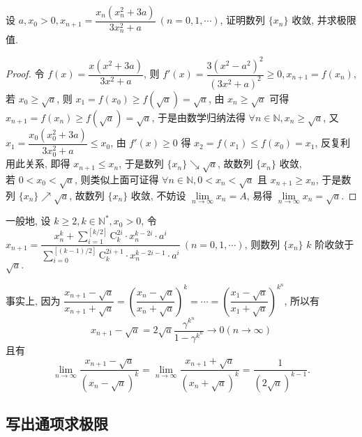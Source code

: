 \begin{example}
    设 $a,x_0>0,x_{n+1}=\dfrac{x_n\left(x_n^2+3a\right)}{3x_n^2+a}~  (n=0,1,\cdots)$, 证明数列 $\{x_n\}$ 收敛, 并求极限值.
\end{example}
\begin{proof}
    令 $f(x)=\dfrac{x(x^2+3a)}{3x^2+a}$, 则 $f'(x) =\dfrac{3\left( x^{2}-a^{2}\right) ^{2}}{\left( 3x^{2}+a\right) ^{2}}\geqslant 0,x_{n+1}=f(x_n)$, \\
    若 $x_0\geqslant \sqrt{a}$, 则 $x_1=f(x_0)\geqslant f\left(\sqrt a\right)=\sqrt{a}$, 由 $x_n\geqslant \sqrt{a}$ 可得 $x_{n+1}=f(x_n)\geqslant f\left(\sqrt{a}\right)=\sqrt{a}$, 
    于是由数学归纳法得 $\forall n\in\mathbb{N},x_n\geqslant\sqrt{a}$, 又 $x_1=\dfrac{x_0\left(x_0^2+3a\right)}{3x_0^2+a}\leqslant x_0$, 由 $f'(x)\geqslant 0$ 得 $x_2=f(x_1)\leqslant f(x_0)=x_1$, 反复利用此关系, 
    即得 $x_{n+1}\leqslant x_n$, 于是数列 $\{x_n\}\searrow\sqrt{a}$, 故数列 $\{x_n\}$ 收敛, \\
    若 $0<x_0<\sqrt{a}$, 则类似上面可证得 $\forall n\in\mathbb{N},0<x_n<\sqrt{a}$ 且 $x_{n+1}\geqslant x_{n}$, 于是数列 $\{x_n\}\nearrow\sqrt{a}$, 故数列 $\{x_n\}$ 收敛, 
    不妨设 $\lim\limits_{n\to\infty}x_n=A$, 易得 $\lim\limits_{n\to\infty}x_n=\sqrt{a}.$
\end{proof}
\begin{inference}
    一般地, 设 $k\geqslant 2,k\in\mathbb{N}^*,x_0>0$, 令 $x_{n+1}=\dfrac{\displaystyle x_{n}^{k}+\sum\limits ^{\left[ k/2\right] }_{i=1}\mathrm{C}_{k}^{2i}\cdot x_{n}^{k-2i}\cdot a^{i}}{\displaystyle\sum\limits ^{\left[ \left( k-1\right) /2\right] }_{i=0}\mathrm{C}_{k}^{2i+1}\cdot x_{n}^{k-2i-1}\cdot a^{i}}~  (n=0,1,\cdots)$, 
    则数列 $\{x_n\}$ $k$ 阶收敛于 $\sqrt{a}.$

    事实上, 因为 $\dfrac{x_{n+1}-\sqrt{a}}{x_{n+1}+\sqrt{a}}=\left( \dfrac{x_{n}-\sqrt{a}}{x_{n}+\sqrt{a}}\right) ^{k}=\cdots =\left( \dfrac{x_{1}-\sqrt{a}}{x_{1}+\sqrt{a}}\right) ^{k^{n}}$, 
    所以有 $$x_{n+1}-\sqrt{a}=2\sqrt{a}\dfrac{\gamma ^{k^{n}}}{1-\gamma ^{k^{n}}}\rightarrow 0\left( n\rightarrow \infty \right) $$
    且有
    $$\lim _{n\rightarrow \infty }\dfrac{x_{n+1}-\sqrt{a}}{\left( x_{n}-\sqrt{a}\right) ^{k}}=\lim _{n\rightarrow \infty }\dfrac{x_{n+1}+\sqrt{a}}{\left( x_{n}+\sqrt{a}\right) ^{k}}=\dfrac{1}{\left( 2\sqrt{a}\right) ^{k-1}}.$$
\end{inference}

\subsection{写出通项求极限}

